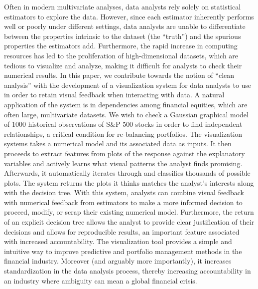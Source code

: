 
Often in modern multivariate analyses, data analysts rely solely on statistical estimators to explore the data. However, since each estimator inherently performs well or poorly under different settings, data analysts are unable to differentiate between the properties intrinsic to the dataset (the “truth”) and the spurious properties the estimators add. Furthermore, the rapid increase in computing resources has led to the proliferation of high-dimensional datasets, which are tedious to visualize and analyze, making it difficult for analysts to check their numerical results. In this paper, we contribute towards the notion of “clean analysis” with the development of a visualization system for data analysts to use in order to retain visual feedback when interacting with data. A natural application of the system is in dependencies among financial equities, which are often large, multivariate datasets. We wish to check a Gaussian graphical model of 1000 historical observations of S\&P 500 stocks in order to find independent relationships, a critical condition for re-balancing portfolios. The visualization systems takes a numerical model and its associated data as inputs. It then proceeds to extract features from plots of the response against the explanatory variables and actively learns what visual patterns the analyst finds promising. Afterwards, it automatically iterates through and classifies thousands of possible plots. The system returns the plots it thinks matches the analyst’s interests along with the decision tree. With this system, analysts can combine visual feedback with numerical feedback from estimators to make a more informed decision to proceed, modify, or scrap their existing numerical model. Furthermore, the return of an explicit decision tree allows the analyst to provide clear justification of their decisions and allows for reproducible results, an important feature associated with increased accountability. The visualization tool provides a simple and intuitive way to improve predictive and portfolio management methods in the financial industry. Moreover (and arguably more importantly), it increases standardization in the data analysis process, thereby increasing accountability in an industry where ambiguity can mean a global financial crisis.